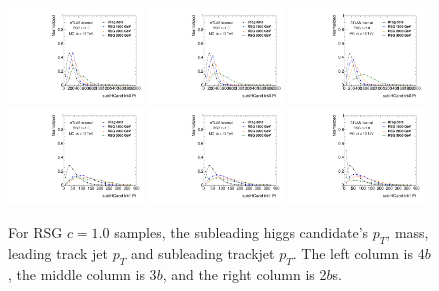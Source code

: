 \begin{figure}[htbp!]
\begin{center}
\includegraphics[width=0.32\textwidth,angle=-90]{figures/boosted/Truth/Moriond_comp_0_FourTag_Signal_sublHCand_trk0_Pt.pdf}
\includegraphics[width=0.32\textwidth,angle=-90]{figures/boosted/Truth/Moriond_comp_0_ThreeTag_Signal_sublHCand_trk0_Pt.pdf}
\includegraphics[width=0.32\textwidth,angle=-90]{figures/boosted/Truth/Moriond_comp_0_TwoTag_split_Signal_sublHCand_trk0_Pt.pdf}\\
\includegraphics[width=0.32\textwidth,angle=-90]{figures/boosted/Truth/Moriond_comp_0_FourTag_Signal_sublHCand_trk1_Pt.pdf}
\includegraphics[width=0.32\textwidth,angle=-90]{figures/boosted/Truth/Moriond_comp_0_ThreeTag_Signal_sublHCand_trk1_Pt.pdf}
\includegraphics[width=0.32\textwidth,angle=-90]{figures/boosted/Truth/Moriond_comp_0_TwoTag_split_Signal_sublHCand_trk1_Pt.pdf}\\
\caption{For RSG $c=1.0$ samples, the subleading higgs candidate's $p_T$, mass, leading track jet $p_T$ and subleading trackjet $p_T$. The left column is 4$b$, the middle column is 3$b$, and the right column is 2$b$s.}
\label{fig:app-signal-sublHCand}
\end{center}
\end{figure}
